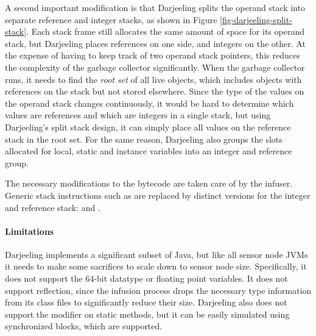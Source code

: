 A second important modification is that Darjeeling splits the operand stack into separate reference and integer stacks, as shown in Figure \ref{fig-darjeeling-split-stack}. Each stack frame still allocates the same amount of space for its operand stack, but Darjeeling places references on one side, and integers on the other. At the expense of having to keep track of two operand stack pointers, this reduces the complexity of the garbage collector significantly. When the garbage collector runs, it needs to find the \emph{root set} of all live objects, which includes objects with references on the stack but not stored elsewhere. Since the type of the values on the operand stack changes continuously, it would be hard to determine which values are references and which are integers in a single stack, but using Darjeeling's split stack design, it can simply place all values on the reference stack in the root set. For the same reason, Darjeeling also groups the slots allocated for local, static and instance variables into an integer and reference group.

The necessary modifications to the bytecode are taken care of by the infuser. Generic stack instructions such as  are replaced by distinct versions for the integer and reference stack:  and .

\paragraph{Limitations}
Darjeeling implements a significant subset of Java, but like all sensor node JVMs it needs to make some sacrifices to scale down to sensor node size. Specifically, it does not support the 64-bit  datatype or floating point variables. It does not support reflection, since the infusion process drops the necessary type information from its class files to significantly reduce their size. Darjeeling also does not support the  modifier on static methods, but it can be easily simulated using synchronized blocks, which are supported.

